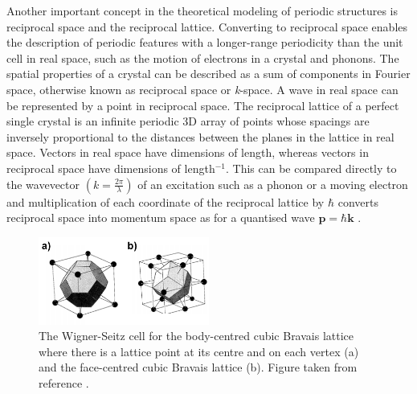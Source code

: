 \documentclass[11pt, twoside]{report}
\begin{document}
Another important concept in the theoretical modeling of periodic structures is reciprocal space and the reciprocal lattice. 
Converting to reciprocal space enables the description of periodic features with a longer-range periodicity than the unit cell in real space, such as the motion of electrons in a crystal and phonons.
The spatial properties of a crystal can be described as a sum of components in Fourier space, otherwise known as reciprocal space or \textit{k}-space. A wave in real space can be represented by a point in reciprocal space. The reciprocal lattice of a perfect single crystal is an infinite periodic 3D array of points whose spacings are inversely proportional to the distances between the planes in the lattice in real space. Vectors in real space have dimensions of length, whereas vectors in reciprocal space have dimensions of length$^{-1}$. This can be compared directly to the wavevector $ \left(k  = \frac{2\pi}{\lambda} \right)$ of an excitation such as a phonon or a moving electron and multiplication of each coordinate of the reciprocal lattice by $\hbar$ converts reciprocal space into momentum space as for a quantised wave $\mathbf{p} = \hbar \mathbf{k}$ \cite{Blakemore1}. 

\begin{figure}[h!]
  \centering
    \includegraphics[width=0.5\textwidth]{figures/Wigner-Seitz.png}
    \caption[The Wigner-Seitz cell for the body-centred cubic Bravais lattice where there is a lattice point at its centre and on each vertex (a) and the face-centred cubic Bravais lattice (b).]{The Wigner-Seitz cell for the body-centred cubic Bravais lattice where there is a lattice point at its centre and on each vertex (a) and the face-centred cubic Bravais lattice (b). 
    Figure taken from reference .}
  \label{Wigner-Seitz}
\end{figure}
\end{document}

